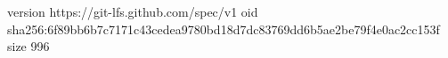 version https://git-lfs.github.com/spec/v1
oid sha256:6f89bb6b7c7171c43cedea9780bd18d7dc83769dd6b5ae2be79f4e0ac2cc153f
size 996
